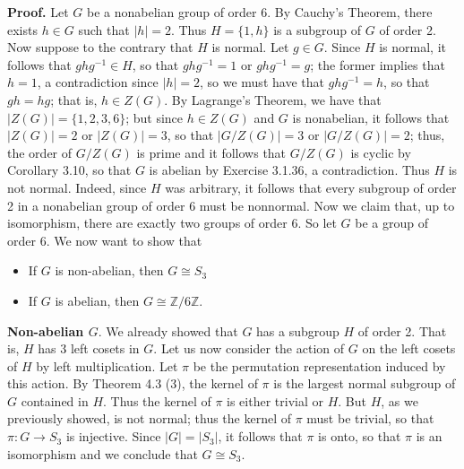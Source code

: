 \documentclass[9pt]{article}
\newcommand{\Z}{\mathbb{Z}}
\begin{document}
\begin{enumerate}
      \textbf{Proof.} Let $G$ be a nonabelian group of order 6. By Cauchy's
      Theorem, there exists $h \in G$ such that $|h| = 2$. Thus $H = \{1, h\}$
      is a subgroup of $G$ of order 2. Now suppose to the contrary that $H$ is
      normal. Let $g \in G$. Since $H$ is normal, it follows that
      $ghg^{-1} \in H$, so that $ghg^{-1} = 1$ or $ghg^{-1} = g$; the former
      implies that $h = 1$, a contradiction since $|h| = 2$, so we must have
      that $ghg^{-1} = h$, so that $gh = hg$; that is, $h \in Z(G)$. By
      Lagrange's Theorem, we have that $|Z(G)| = \{1, 2, 3, 6\}$; but since
      $h \in Z(G)$ and $G$ is nonabelian, it follows that $|Z(G)| = 2$ or
      $|Z(G)| = 3$, so that $|G/Z(G)| = 3$ or $|G/Z(G)| = 2$; thus, the order of
      $G/Z(G)$ is prime and it follows that $G/Z(G)$ is cyclic by Corollary
      3.10, so that $G$ is abelian by Exercise 3.1.36, a contradiction. Thus $H$
      is not normal. Indeed, since $H$ was arbitrary, it follows that every
      subgroup of order 2 in a nonabelian group of order 6 must be nonnormal.
      Now we claim that, up to isomorphism, there are exactly two groups of
      order 6. So let $G$ be a group of order 6. We now want to show that
      \begin{itemize}
         \item If $G$ is non-abelian, then $G \cong S_3$
         \item If $G$ is abelian, then $G \cong \Z/6\Z$.
      \end{itemize}
      
      \textbf{Non-abelian $G$}. We already showed that $G$ has a subgroup $H$ of
      order 2. That is, $H$ has 3 left cosets in $G$. Let us now consider the
      action of $G$ on the left cosets of $H$ by left multiplication. Let $\pi$
      be the permutation representation induced by this action. By Theorem
      4.3 (3), the kernel of $\pi$ is the largest normal subgroup of $G$
      contained in $H$. Thus the kernel of $\pi$ is either trivial or $H$. But
      $H$, as we previously showed, is not normal; thus the kernel of $\pi$ must
      be trivial, so that $\pi : G \rightarrow S_3$ is injective. Since
      $|G| = |S_3|$, it follows that $\pi$ is onto, so that $\pi$ is an
      isomorphism and we conclude that $G \cong S_3$.
      

\end{enumerate}
\end{document}
